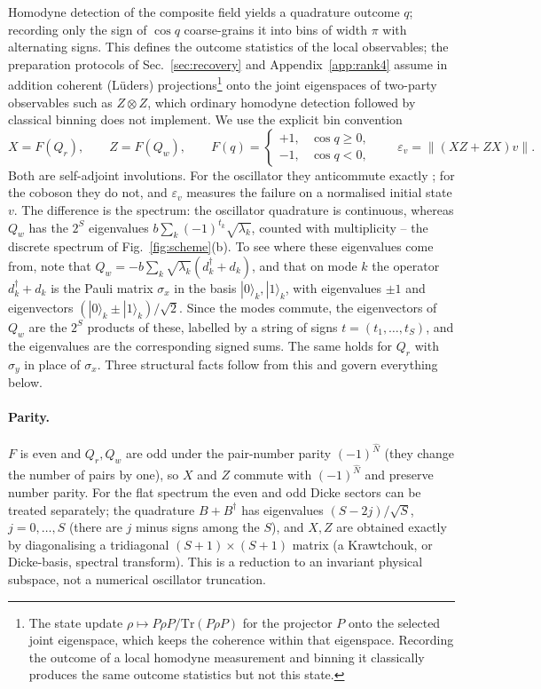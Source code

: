 \documentclass[11pt,a4paper]{article}
\newcommand{\ket}[1]{|#1\rangle}
\begin{document}
Homodyne detection of the composite field yields a quadrature outcome $q$; recording only the sign of $\cos q$ coarse-grains it into bins of width $\pi$ with alternating signs. This defines the outcome statistics of the local observables; the preparation protocols of Sec.~\ref{sec:recovery} and Appendix~\ref{app:rank4} assume in addition coherent (L\"uders) projections\footnote{The state update $\rho\mapsto P\rho P/\mathrm{Tr}(P\rho P)$ for the projector $P$ onto the selected joint eigenspace, which keeps the coherence within that eigenspace. Recording the outcome of a local homodyne measurement and binning it classically produces the same outcome statistics but not this state.} onto the joint eigenspaces of two-party observables such as $Z\otimes Z$, which ordinary homodyne detection followed by classical binning does not implement. We use the explicit bin convention
\begin{equation}
X=F(Q_r),\qquad Z=F(Q_w),\qquad F(q)=\begin{cases}+1,&\cos q\ge0,\\-1,&\cos q<0,\end{cases}\qquad
\varepsilon_v=\|(XZ+ZX)v\| .
\label{eq:bins}
\end{equation}
Both are self-adjoint involutions. For the oscillator they anticommute exactly \cite{Sorella2026}; for the coboson they do not, and $\varepsilon_v$ measures the failure on a normalised initial state $v$. The difference is the spectrum: the oscillator quadrature is continuous, whereas $Q_w$ has the $2^S$ eigenvalues $b\sum_k(-1)^{t_k}\sqrt{\lambda_k}$, counted with multiplicity -- the discrete spectrum of Fig.~\ref{fig:scheme}(b). To see where these eigenvalues come from, note that $Q_w=-b\sum_k\sqrt{\lambda_k}(d_k^\dagger+d_k)$, and that on mode $k$ the operator $d_k^\dagger+d_k$ is the Pauli matrix $\sigma_x$ in the basis $\ket0_k,\ket1_k$, with eigenvalues $\pm1$ and eigenvectors $(\ket0_k\pm\ket1_k)/\sqrt2$. Since the modes commute, the eigenvectors of $Q_w$ are the $2^S$ products of these, labelled by a string of signs $t=(t_1,\dots,t_S)$, and the eigenvalues are the corresponding signed sums. The same holds for $Q_r$ with $\sigma_y$ in place of $\sigma_x$. Three structural facts follow from this and govern everything below.

\paragraph{Parity.}
$F$ is even and $Q_r,Q_w$ are odd under the pair-number parity $(-1)^{\hat N}$ (they change the number of pairs by one), so $X$ and $Z$ commute with $(-1)^{\hat N}$ and preserve number parity. For the flat spectrum the even and odd Dicke sectors can be treated separately; the quadrature $B+B^\dagger$ has eigenvalues $(S-2j)/\sqrt S$, $j=0,\dots,S$ (there are $j$ minus signs among the $S$), and $X,Z$ are obtained exactly by diagonalising a tridiagonal $(S+1)\times(S+1)$ matrix (a Krawtchouk, or Dicke-basis, spectral transform). This is a reduction to an invariant physical subspace, not a numerical oscillator truncation.
\end{document}
